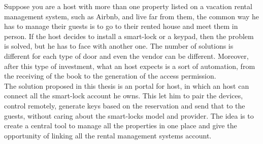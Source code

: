 Suppose you are a host with more than one property listed on a vacation rental management system, such as Airbnb, and live far from them, the common way he has to manage their guests is to go to their rented house and meet them in person. If the host decides to install a smart-lock or a keypad, then the problem is solved, but he has to face with another one. The number of solutions is different for each type of door and even the vendor can be different. Moreover, after this type of investment, what an host expects is a sort of automation, from the receiving of the book to the generation of the access permission. 
\\ The solution proposed in this thesis is an portal for host, in which an host can connect all the smart-lock account he owns. This let him to pair the devices, control remotely, generate keys based on the reservation and send that to the guests, without caring about the smart-locks model and provider. The idea is to create a central tool to manage all the properties in one place and give the opportunity of linking all the rental management systems account.